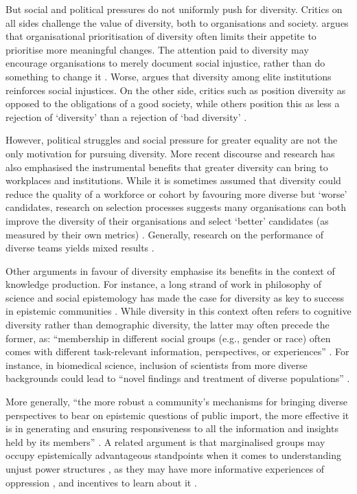 But social and political pressures do not uniformly push for diversity. Critics on all sides challenge the value of diversity, both to organisations and society. \textcite{Ahmed_2012} argues that organisational prioritisation of diversity often limits their appetite to prioritise more meaningful changes. The attention paid to diversity may encourage organisations to merely document social injustice, rather than do something to change it \cite{Ahmed_2012,Rossi2020-ROSWNA-2}. Worse, \textcite{Warikoo_2019} argues that diversity among elite institutions reinforces social injustices. On the other side, critics such as \textcite{Goodhart} position diversity as opposed to the obligations of a good society, while others position this as less a rejection of `diversity' than a rejection of `bad diversity' \cite{lentin_Multiculturalism_2011}.

However, political struggles and social pressure for greater equality are not the only motivation for pursuing diversity. More recent discourse and research has also emphasised the instrumental benefits that greater diversity can bring to workplaces and institutions. While it is sometimes assumed that diversity could reduce the quality of a workforce or cohort by favouring more diverse but `worse' candidates, research on selection processes suggests many organisations can both improve the diversity of their organisations and select `better' candidates (as measured by their own metrics) \cite{autor2008does,noray2023systemic}. Generally, research on the performance of diverse teams yields mixed results \cite{daubner2017dovetailing,page_diversity_2017,noray2023systemic,muller_learning_2019}.

Other arguments in favour of diversity emphasise its benefits in the context of knowledge production. For instance, a long strand of work in philosophy of science and social epistemology has made the case for diversity as key to success in epistemic communities \cite{mill1998liberty,merton1942note,wylie2006introduction}. While diversity in this context often refers to cognitive diversity rather than demographic diversity, the latter may often precede the former, as: ``membership in different social groups (e.g., gender or race) often comes with different task-relevant information, perspectives, or experiences'' \cite{peters2021hidden}. For instance, in biomedical science, inclusion of scientists from more diverse backgrounds could lead to ``novel findings and treatment of diverse populations'' \cite{swartz2019science}.

More generally, ``the more robust a community’s mechanisms for bringing diverse perspectives to bear on epistemic questions of public import, the more effective it is in generating and ensuring responsiveness to all the information and insights held by its members'' \cite{wylie2006introduction}. A related argument is that marginalised groups may occupy epistemically advantageous standpoints when it comes to understanding unjust power structures \cite{harding2004feminist,dror2023there,steel_multiple_2018}, as they may have more informative experiences of oppression \cite{mills2015blackness}, and incentives to learn about it \cite{jaggar1983feminist}.

